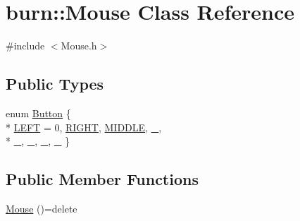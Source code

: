 \hypertarget{classburn_1_1_mouse}{\section{burn\-:\-:Mouse Class Reference}
\label{classburn_1_1_mouse}
}


{\ttfamily \#include $<$Mouse.\-h$>$}

\subsection*{Public Types}
\begin{DoxyCompactItemize}
\item 
enum \hyperlink{classburn_1_1_mouse_ade100e00a955fdf0a15a611fac396094}{Button} \{ \\*
\hyperlink{classburn_1_1_mouse_ade100e00a955fdf0a15a611fac396094aa8ea09135561df662c7d2ac7e97de71f}{L\-E\-F\-T} = 0, 
\hyperlink{classburn_1_1_mouse_ade100e00a955fdf0a15a611fac396094a69310b83b775e9d8a5a0ea2fd0188db8}{R\-I\-G\-H\-T}, 
\hyperlink{classburn_1_1_mouse_ade100e00a955fdf0a15a611fac396094a78d976c26727204eff3513f05ba8f25a}{M\-I\-D\-D\-L\-E}, 
\hyperlink{classburn_1_1_mouse_ade100e00a955fdf0a15a611fac396094a272e3349d16f8e6ce5cc230aa4d01a87}{\-\_}, 
\\*
\hyperlink{classburn_1_1_mouse_ade100e00a955fdf0a15a611fac396094ace0766ebb132fda5a9e14a84619b0507}{\-\_}, 
\hyperlink{classburn_1_1_mouse_ade100e00a955fdf0a15a611fac396094af29dddae5e412600ddfbcd545c2c92b5}{\-\_}, 
\hyperlink{classburn_1_1_mouse_ade100e00a955fdf0a15a611fac396094aa12762152aa016248f3528a5c5217316}{\-\_}, 
\hyperlink{classburn_1_1_mouse_ade100e00a955fdf0a15a611fac396094a7b518fea9868447a453fc40924a0c0d5}{\-\_}
 \}
\end{DoxyCompactItemize}
\subsection*{Public Member Functions}
\begin{DoxyCompactItemize}
\item 
\hyperlink{classburn_1_1_mouse_acc73a9e580257d047e2caf3d9be88aee}{Mouse} ()=delete
\end{DoxyCompactItemize}
